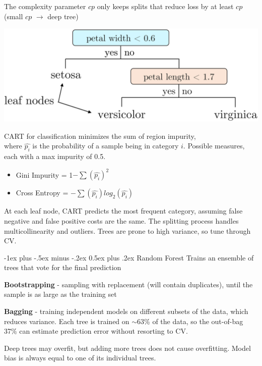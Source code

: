 \documentclass[10pt,landscape]{article}
\makeatletter
\renewcommand{\subsection}{\@startsection{subsection}{2}{0mm}%
                                {-1ex plus -.5ex minus -.2ex}%
                                {0.5ex plus .2ex}%
                                {\normalfont\normalsize\bfseries}}
\makeatother
\begin{document}
\begin{multicols}{3}
The complexity parameter $cp$ only keeps splits that reduce loss by at least $cp$ (small $cp$ $\to$ deep tree)
\smallskip
\begin{center}
\vspace{-1mm}
    \includegraphics[scale = .08]{images/CART.JPG}
\end{center}
\vspace{-2mm}
CART for classification minimizes the sum of region impurity, \\
where $\hat{p_i}$ is the probability of a sample being in category $i$.
Possible measures, each with a max impurity of 0.5.
\begin{itemize}[label={--},leftmargin=4mm]
\vspace{-1mm}
\itemsep -.4mm
\item Gini Impurity = 1$ - \sum (\hat{p_i})^2$
\item Cross Entropy = $-\sum (\hat{p_i}) log_2(\hat{p_i})$
\end{itemize}
At each leaf node, CART predicts the most frequent category, assuming false negative and false positive costs are the same. The splitting process handles multicollinearity and outliers. Trees are prone to high variance, so tune through CV.

\subsection{Random Forest}
Trains an ensemble of trees that vote for the final prediction

\textbf{Bootstrapping} - sampling with replacement (will contain duplicates), until the sample is as large as the training set

\textbf{Bagging} - training independent models on different subsets of the data, which reduces variance. Each tree is trained on $\sim$63\% of the data, so the out-of-bag 37\% can estimate prediction error without resorting to CV.

Deep trees may overfit, but adding more trees does not cause overfitting. Model bias is always equal to one of its individual trees.


\end{multicols}
\end{document}

